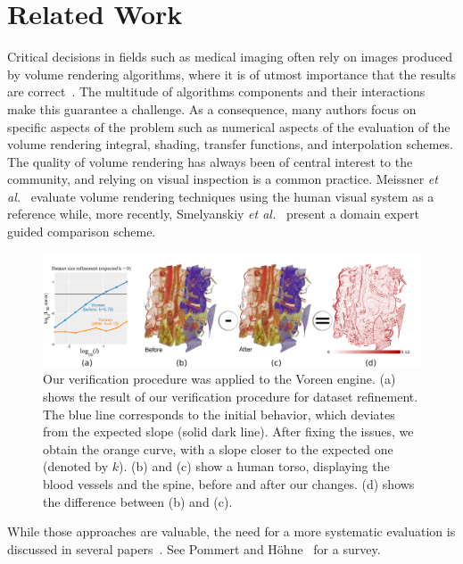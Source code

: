 \section{Related Work}
\label{sec:related-works}

Critical decisions in fields such as medical imaging often rely on
images produced by volume rendering algorithms, where it is of utmost
importance that the results are correct~\cite{Duncan2000}.  The
multitude of algorithms components and their interactions make
this guarantee a challenge. As a consequence, many authors focus on specific
aspects of the problem such as numerical aspects of the evaluation of
the volume rendering integral, shading, transfer functions, and
interpolation schemes.  The quality of volume rendering has always
been of central interest to the community, and relying on visual
inspection is a common practice. Meissner \emph{et
al.}~\cite{Meissner:2000:PEP:353888.353903} evaluate volume rendering
techniques using the human visual system as a reference while, more
recently, Smelyanskiy \emph{et
al.}~\cite{Smelyanskiy:2009:MHV:1638611.1639155} present a domain expert guided comparison scheme.
%
\begin{landscape}
\begin{figure}[t]
\centering
\includegraphics[width=1\linewidth]{chapter5/figures/teaser.png}
\caption{\label{chap5:fig:teaser} Our verification procedure was applied to the Voreen engine. (a) shows the result of our verification procedure
  for dataset refinement. The
  blue line corresponds to the initial behavior, which deviates from
  the expected slope (solid dark line).  After fixing
  the issues, we obtain the orange curve, with a slope closer to the
  expected one (denoted by $k$). (b) and (c) show a
  human torso, displaying the blood vessels and the spine, before and
  after our changes.  (d) shows the difference between (b) and (c).}
\end{figure}
\end{landscape}
%
While those approaches are valuable, the need for a more systematic
evaluation is discussed in several
papers~\cite{globus95,Johnson:2004:TSV:1018014.1018051,Johnson:2003:NSV:942583.942610,kirby-vv-08}. See Pommert and
H\"{o}hne~\cite{Pommert2002,Pommert2003} for a survey.

